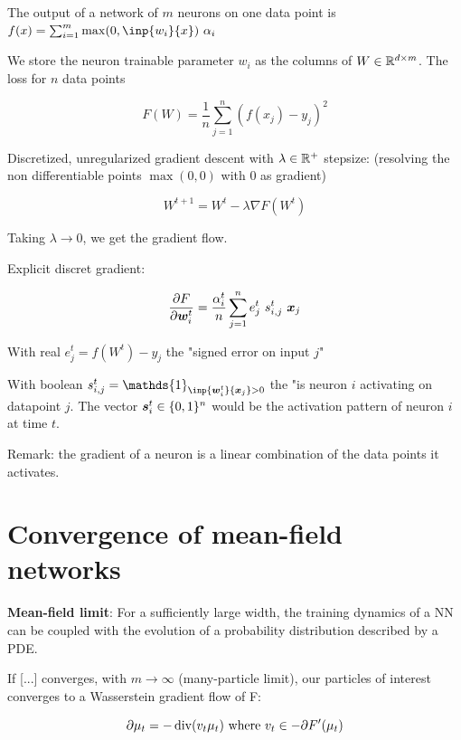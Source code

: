 The output of a network of $m$ neurons on one data point is $f(x) = \sum_{i=1}^{m} \max(0, \inp{w_i}{x}) ~ \alpha_i$

We store the neuron trainable parameter $w_i$ as the columns of $W \in \mathbb{R}^{d \times m}$. The loss for $n$ data points

\begin{equation}
	F(W) = \frac{1}{n} \sum_{j=1}^{n} \left(f(x_j) - y_j\right)^2
\end{equation}

Discretized, unregularized gradient descent with $\lambda \in \mathbb{R}^+$ stepsize: (resolving the non differentiable points $\max(0, 0)$ with 0 as gradient)

\begin{equation}
	W^{t+1} = W^t - \lambda \nabla F(W^t)
\end{equation}

Taking $\lambda \rightarrow 0$, we get the gradient flow.

Explicit discret gradient:

\begin{equation}
	\frac{\partial F}{\partial {\bm{w}}^t_i} = \frac{\alpha^t_i}{n} \sum_{j=1}^{n} e^t_j ~ s^t_{i, j} ~ {\bm{x}}_j
\end{equation}

With real $e^t_j = f(W^t) - y_j$ the "signed error on input $j$"

With boolean $s^t_{i, j} = \mathds{1}_{\inp{\vw^t_i}{\vx_j} > 0}$ the "is neuron $i$ activating on datapoint $j$. The vector ${\bm{s}}^t_{i} \in \{0, 1\}^n$ would be the activation pattern of neuron $i$ at time $t$.

Remark: the gradient of a neuron is a linear combination of the data points it activates.


\section{Convergence of mean-field networks}

\textbf{Mean-field limit}\citep{chizatGlobalConvergenceGradient2018}: For a sufficiently large width, the training dynamics of a NN can be coupled with the evolution of a probability distribution described by a PDE.

If [...] converges, with $m \rightarrow \infty$ (many-particle limit), our particles of interest converges to a Wasserstein gradient flow of F:

\begin{equation}
	\partial \mu_t = - \operatorname*{div}(v_t \mu_t) \text{ where } v_t \in - \partial F'(\mu_t)
\end{equation}

